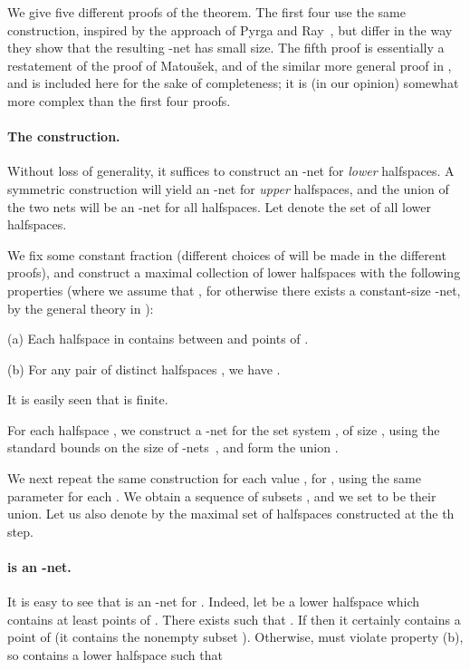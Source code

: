 \documentclass[12pt]{article}
\providecommand{\Matousek}{Matou{\v s}ek\xspace}
\renewcommand{\th}{th\xspace}
\begin{document}
\medskip

We give five different proofs of the theorem. The first four use the
same construction, inspired by the approach of Pyrga and
Ray~\cite{pr-nepen-08}, but differ in the way they show that the resulting
-net has small size. The fifth proof is essentially a
restatement of the proof of \Matousek \cite{m-rph-92}, and of the
similar more general proof in \cite{cv-iaags-07}, and is included here
for the sake of completeness; it is (in our opinion) somewhat more
complex than the first four proofs.

\paragraph{The construction.}
Without loss of generality, it suffices to construct an -net
for {\em lower} halfspaces. A symmetric construction will yield an
-net for {\em upper} halfspaces, and the union of the two nets
will be an -net for all halfspaces.
Let  denote the set of all lower halfspaces.

We fix some constant fraction  (different choices of
 will be made in the different proofs), and construct a
maximal collection  of lower halfspaces with the following
properties (where we assume that , for otherwise
there exists a constant-size -net, by the general theory
in \cite{hw-ensrq-87}):

\begin{description}
    \item{(a)} Each halfspace in  contains between  and
     points of .

    \item{(b)} For any pair of distinct halfspaces ,
    we have .
\end{description}

It is easily seen that  is finite.

For each halfspace , we construct a -net  for
the set system , of size
, using the
standard bounds on the size of -nets~\cite{hw-ensrq-87}, and
form the union .

We next repeat the same construction for each value
, for , using the same parameter
 for each . We obtain a sequence of subsets
, and we set  to be their union.
Let us also denote by  the maximal set of halfspaces
constructed at the \th step.

\paragraph{ is an -net.}
It is easy to see that  is an -net for .
Indeed, let  be a lower halfspace which contains at least 
points of . There exists  such that .  If  then it certainly contains
a point of  (it contains the nonempty subset ).
Otherwise,  must violate property (b), so
 contains a lower halfspace  such that
\end{document}

